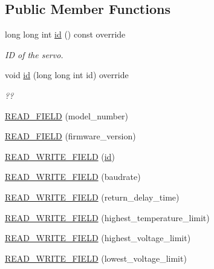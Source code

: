 \subsection*{Public Member Functions}
\begin{DoxyCompactItemize}
\item 
long long int \hyperlink{classdynamixel_1_1servos_1_1_servo_a2d022081672e25a7bb57b76706e1cc57}{id} () const override
\begin{DoxyCompactList}\small\item\em I\+D of the servo. \end{DoxyCompactList}\item 
void \hyperlink{classdynamixel_1_1servos_1_1_servo_a866e0cdb2ee9f3c622305634368b18f2}{id} (long long int id) override
\begin{DoxyCompactList}\small\item\em ?? \end{DoxyCompactList}\item 
\hyperlink{classdynamixel_1_1servos_1_1_servo_a1e066990c79024cc63d7e5ac53fcf51b}{R\+E\+A\+D\+\_\+\+F\+I\+E\+L\+D} (model\+\_\+number)
\item 
\hyperlink{classdynamixel_1_1servos_1_1_servo_a1331b1d5876dc2bc640194aff7d5be34}{R\+E\+A\+D\+\_\+\+F\+I\+E\+L\+D} (firmware\+\_\+version)
\item 
\hyperlink{classdynamixel_1_1servos_1_1_servo_a6ac8b76a420b2b576231f71bd5c0c3bb}{R\+E\+A\+D\+\_\+\+W\+R\+I\+T\+E\+\_\+\+F\+I\+E\+L\+D} (\hyperlink{classdynamixel_1_1servos_1_1_servo_a2d022081672e25a7bb57b76706e1cc57}{id})
\item 
\hyperlink{classdynamixel_1_1servos_1_1_servo_a5960b4dc9b4fb5013ceb5790d241429c}{R\+E\+A\+D\+\_\+\+W\+R\+I\+T\+E\+\_\+\+F\+I\+E\+L\+D} (baudrate)
\item 
\hyperlink{classdynamixel_1_1servos_1_1_servo_a48eb1bdd305f5db2b326f187708f95d8}{R\+E\+A\+D\+\_\+\+W\+R\+I\+T\+E\+\_\+\+F\+I\+E\+L\+D} (return\+\_\+delay\+\_\+time)
\item 
\hyperlink{classdynamixel_1_1servos_1_1_servo_a0cc74d325cb6326c6bb877467a77d035}{R\+E\+A\+D\+\_\+\+W\+R\+I\+T\+E\+\_\+\+F\+I\+E\+L\+D} (highest\+\_\+temperature\+\_\+limit)
\item 
\hyperlink{classdynamixel_1_1servos_1_1_servo_a2cebb6bb933ce04c08954a1d28024be6}{R\+E\+A\+D\+\_\+\+W\+R\+I\+T\+E\+\_\+\+F\+I\+E\+L\+D} (highest\+\_\+voltage\+\_\+limit)
\item 
\hyperlink{classdynamixel_1_1servos_1_1_servo_a05bb43c819899c966245b2bd3efdd3cd}{R\+E\+A\+D\+\_\+\+W\+R\+I\+T\+E\+\_\+\+F\+I\+E\+L\+D} (lowest\+\_\+voltage\+\_\+limit)

\end{DoxyCompactItemize}
